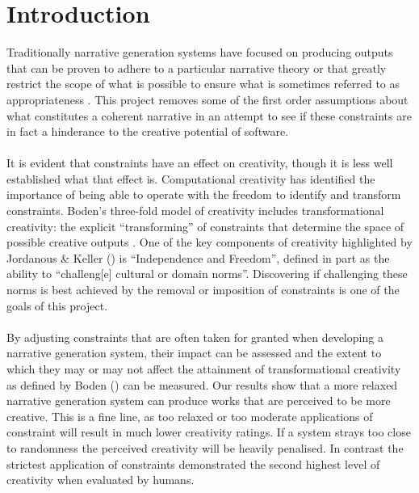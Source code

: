 \documentclass[letterpaper]{article}
\begin{document}
\section{Introduction}
Traditionally narrative generation systems have focused on producing outputs that can be proven to adhere to a particular narrative theory \cite{PickeringJordanous} or that greatly restrict the scope of what is possible \cite{leon2008creative} to ensure what is sometimes referred to as appropriateness \cite{Sharples96anaccount}. This project removes some of the first order assumptions about what constitutes a coherent narrative in an attempt to see if these constraints are in fact a hinderance to the creative potential of software.\\ 
\\It is evident that constraints have an effect on creativity, though it is less well established what that effect is. Computational creativity has identified the importance of being able to operate with the freedom to identify and transform constraints. Boden's three-fold model of creativity includes transformational creativity: the explicit \enquote{transforming} of constraints that determine the space of possible creative outputs \cite{boden2004creative}. One of the key components of creativity highlighted by Jordanous \& Keller (\citeyear{JordanousKeller}) is \enquote{Independence and Freedom}, defined in part as the ability to \enquote{challeng[e] cultural or domain norms}. Discovering if challenging these norms is best achieved by the removal or imposition of constraints is one of the goals of this project.\\
\\By adjusting constraints that are often taken for granted when developing a narrative generation system, their impact can be assessed and the extent to which they may or may not affect the attainment of transformational creativity as defined by Boden (\citeyear{boden2004creative}) can be measured. Our results show that a more relaxed narrative generation system can produce works that are perceived to be more creative. This is a fine line, as too relaxed or too moderate applications of constraint will result in much lower creativity ratings. If a system strays too close to randomness the perceived creativity will be heavily penalised. In contrast the strictest application of constraints demonstrated the second highest level of creativity when evaluated by humans.\\
\end{document}
